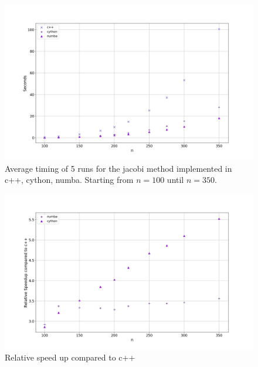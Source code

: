 \begin{figure}[H]
  \centering
  \includegraphics[width=1.0\textwidth]{../figures/speedComp_100_350.png}
  \caption{Average timing of 5 runs for the jacobi method implemented in c++, cython, numba. Starting from $n=100$ until $n=350$.}
  \label{fig:timing_largeN}
\end{figure}

\begin{figure}[H]
  \centering
  \includegraphics[width=1.0\textwidth]{../figures/speedCompC++_100_350.png}
  \caption{Relative speed up compared to c++}
  \label{fig:comp_c++}
\end{figure}

